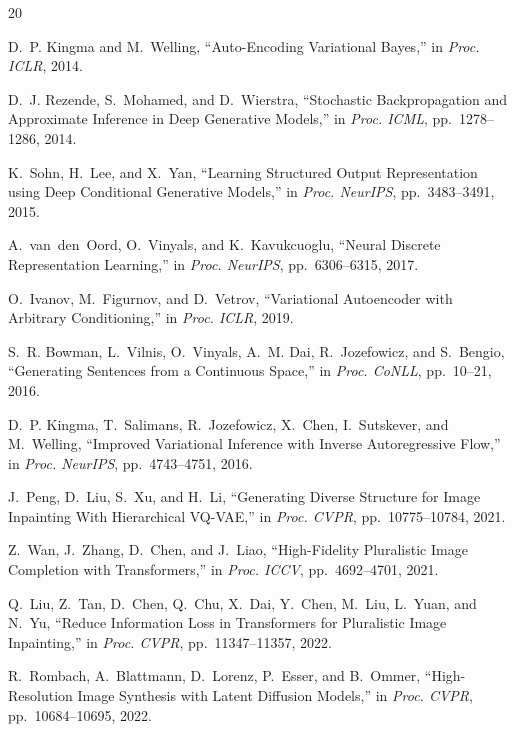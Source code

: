 \documentclass[11pt, a4paper]{article}
\begin{document}
\begin{thebibliography}{20}

D.~P. Kingma and M.~Welling,
``Auto-Encoding Variational Bayes,''
in \textit{Proc. ICLR}, 2014.

D.~J. Rezende, S.~Mohamed, and D.~Wierstra,
``Stochastic Backpropagation and Approximate Inference in Deep Generative Models,''
in \textit{Proc. ICML}, pp.~1278--1286, 2014.

K.~Sohn, H.~Lee, and X.~Yan,
``Learning Structured Output Representation using Deep Conditional Generative Models,''
in \textit{Proc. NeurIPS}, pp.~3483--3491, 2015.

A.~van~den~Oord, O.~Vinyals, and K.~Kavukcuoglu,
``Neural Discrete Representation Learning,''
in \textit{Proc. NeurIPS}, pp.~6306--6315, 2017.

O.~Ivanov, M.~Figurnov, and D.~Vetrov,
``Variational Autoencoder with Arbitrary Conditioning,''
in \textit{Proc. ICLR}, 2019.

S.~R. Bowman, L.~Vilnis, O.~Vinyals, A.~M. Dai, R.~Jozefowicz, and S.~Bengio,
``Generating Sentences from a Continuous Space,''
in \textit{Proc. CoNLL}, pp.~10--21, 2016.

D.~P. Kingma, T.~Salimans, R.~Jozefowicz, X.~Chen, I.~Sutskever, and M.~Welling,
``Improved Variational Inference with Inverse Autoregressive Flow,''
in \textit{Proc. NeurIPS}, pp.~4743--4751, 2016.

J.~Peng, D.~Liu, S.~Xu, and H.~Li,
``Generating Diverse Structure for Image Inpainting With Hierarchical VQ-VAE,''
in \textit{Proc. CVPR}, pp.~10775--10784, 2021.

Z.~Wan, J.~Zhang, D.~Chen, and J.~Liao,
``High-Fidelity Pluralistic Image Completion with Transformers,''
in \textit{Proc. ICCV}, pp.~4692--4701, 2021.

Q.~Liu, Z.~Tan, D.~Chen, Q.~Chu, X.~Dai, Y.~Chen, M.~Liu, L.~Yuan, and N.~Yu,
``Reduce Information Loss in Transformers for Pluralistic Image Inpainting,''
in \textit{Proc. CVPR}, pp.~11347--11357, 2022.

R.~Rombach, A.~Blattmann, D.~Lorenz, P.~Esser, and B.~Ommer,
``High-Resolution Image Synthesis with Latent Diffusion Models,''
in \textit{Proc. CVPR}, pp.~10684--10695, 2022.


\end{thebibliography}
\end{document}
